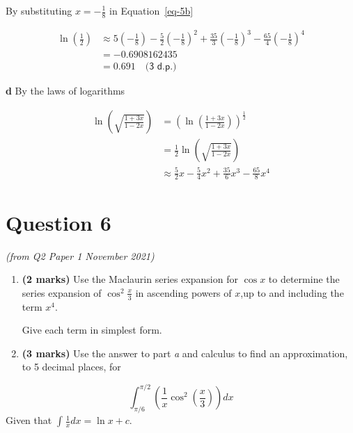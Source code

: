 \documentclass[
  a4paper,
]{report}
\begin{document}
\begin{tcolorbox}
By substituting \(x=-\frac{1}{8}\) in Equation~\ref{eq-5b}

\begin{equation*}
\begin{split}
\ln \left( \frac{1}{2} \right)& \approx  5\left(- \frac{1}{8} \right)-\frac{5}{2}\left( -\frac{1}{8} \right)^2+\frac{35}{3}\left(- \frac{1}{8} \right)^3-\frac{65}{4}\left( -\frac{1}{8} \right)^4 \\
&=-0.6908162435 \\
&= 0.691 \quad \textsf{(3 d.p.)}
\end{split}
\end{equation*}

\textbf{d} By the laws of logarithms

\begin{equation*}
\begin{split}
\ln \left( \sqrt{\frac{1+3x}{1-2x}}\right)&= \left(\ln \left( \frac{1+3x}{1-2x}\right)\right)^{\frac{1}{2}} \\
&=\frac{1}{2}\ln \left( \sqrt{\frac{1+3x}{1-2x}}\right) \\
& \approx \frac{5}{2}x-\frac{5}{4}x^2+\frac{35}{6}x^3-\frac{65}{8}x^4
\end{split}
\end{equation*}

\end{tcolorbox}

\section{Question 6}\label{question-6}

\emph{(from Q2 Paper 1 November 2021)}

\begin{enumerate}
\def\labelenumi{\alph{enumi}.}
\item
  \textbf{(2 marks)} Use the Maclaurin series expansion for \(\cos x\)
  to determine the series expansion of \(\cos^{2}\frac{x}{3}\) in
  ascending powers of \(x\),up to and including the term \(x^{4}\).

  Give each term in simplest form.
\item
  \textbf{(3 marks)} Use the answer to part \emph{a} and calculus to
  find an approximation, to 5 decimal places, for
\end{enumerate}

\[\int_{\pi/6}^{\pi/2}{\left( \frac{1}{x}\cos^{2}\left( \frac{x}{3} \right) \right)dx}\]
Given that \(\int_{}^{}{\frac{1}{x}dx = \ln{x + c}}\).
\end{document}
